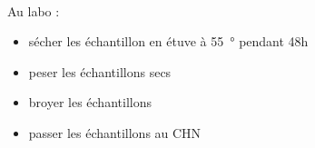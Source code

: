 \documentclass{article}
\begin{document}
	\paragraph{} Au labo :
	\begin{itemize}
		\item sécher les échantillon en étuve à \SI{55}{\degree} pendant 48h
		\item peser les échantillons secs
		\item broyer les échantillons
		\item passer les échantillons au CHN
	\end{itemize}
	\pagebreak
	
\end{document}
